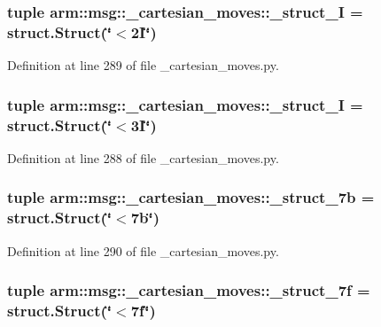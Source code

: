 \subsubsection[{\-\_\-struct\-\_\-2\-I}]{\setlength{\rightskip}{0pt plus 5cm}tuple {\bf arm\-::msg\-::\-\_\-cartesian\-\_\-moves\-::\-\_\-struct\-\_\-I} = struct.\-Struct(\char`\"{}$<$2\-I\char`\"{})}\label{namespacearm_1_1msg_1_1__cartesian__moves_adbdfb1c86871fbbed54437476ae7ea48}


\-Definition at line 289 of file \-\_\-cartesian\-\_\-moves.\-py.

\subsubsection[{\-\_\-struct\-\_\-3\-I}]{\setlength{\rightskip}{0pt plus 5cm}tuple {\bf arm\-::msg\-::\-\_\-cartesian\-\_\-moves\-::\-\_\-struct\-\_\-I} = struct.\-Struct(\char`\"{}$<$3\-I\char`\"{})}\label{namespacearm_1_1msg_1_1__cartesian__moves_a463128e514b42e777143c2b3270d6ef5}


\-Definition at line 288 of file \-\_\-cartesian\-\_\-moves.\-py.

\subsubsection[{\-\_\-struct\-\_\-7b}]{\setlength{\rightskip}{0pt plus 5cm}tuple {\bf arm\-::msg\-::\-\_\-cartesian\-\_\-moves\-::\-\_\-struct\-\_\-7b} = struct.\-Struct(\char`\"{}$<$7b\char`\"{})}\label{namespacearm_1_1msg_1_1__cartesian__moves_a52ffce20ab4e4f327b0dab299e6d90c1}


\-Definition at line 290 of file \-\_\-cartesian\-\_\-moves.\-py.

\subsubsection[{\-\_\-struct\-\_\-7f}]{\setlength{\rightskip}{0pt plus 5cm}tuple {\bf arm\-::msg\-::\-\_\-cartesian\-\_\-moves\-::\-\_\-struct\-\_\-7f} = struct.\-Struct(\char`\"{}$<$7f\char`\"{})}\label{namespacearm_1_1msg_1_1__cartesian__moves_a69771555029b4062ebd115b40879796f}


